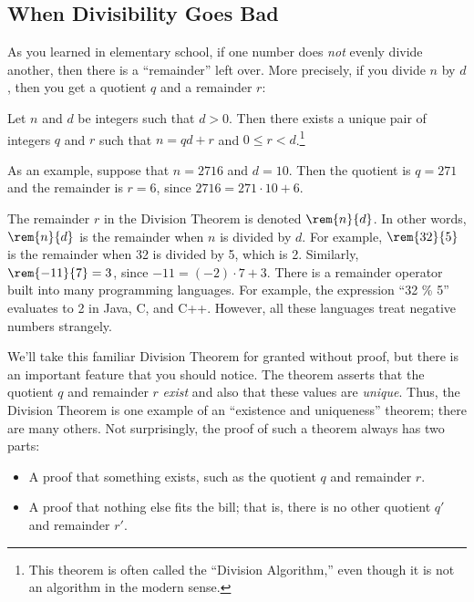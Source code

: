 \subsection{When Divisibility Goes Bad}

As you learned in elementary school, if one number does \textit{not}
evenly divide another, then there is a ``remainder'' left over.  More
precisely, if you divide $n$ by $d$, then you get a quotient $q$ and a
remainder $r$:

\begin{theorem}
Let $n$ and $d$ be integers such that $d > 0$.  Then there exists a
unique pair of integers $q$ and $r$ such that $n = qd + r$ and $0 \leq
r < d$.\footnote{This theorem is often called the ``Division Algorithm,'' even
though it is not an algorithm in the modern sense.}
\end{theorem}

As an example, suppose that $n = 2716$ and $d = 10$.  Then the
quotient is $q = 271$ and the remainder is $r = 6$, since $2716 = 271
\cdot 10 + 6$.

The remainder $r$ in the Division Theorem is denoted $\rem{n}{d}$.  In
other words, $\rem{n}{d}$ is the remainder when $n$ is divided by $d$.
For example, $\rem{32}{5}$ is the remainder when 32 is divided by 5, which
is 2.  Similarly, $\rem{-11}{7} = 3$, since $-11 = (-2) \cdot 7 + 3$.
There is a remainder operator built into many programming languages.  For
example, the expression ``32 \% 5'' evaluates to 2 in Java, C, and C++.
However, all these languages treat negative numbers strangely.

We'll take this familiar Division Theorem for granted without proof, but 
there is an important feature that you should notice.  The theorem asserts 
that the quotient $q$ and remainder $r$ \textit{exist} and also that these
values are \textit{unique}.  Thus, the Division Theorem is one example
of an ``existence and uniqueness'' theorem; there are many others.
Not surprisingly, the proof of such a theorem always has two parts:
%
\begin{itemize}
\item A proof that something exists, such as the quotient $q$ and
remainder $r$.
\item A proof that nothing else fits the bill; that is, there is no
other quotient $q'$ and remainder $r'$.
\end{itemize}
%

